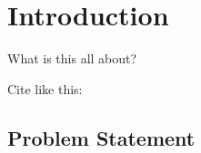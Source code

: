 \chapter{Introduction}
What is this all about?

Cite like this: \cite{NIPS2014_5423}

\section{Problem Statement}

